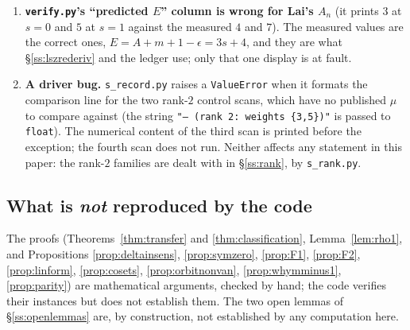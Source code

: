 \begin{enumerate}[label=\textup{(\alph*)},leftmargin=2.6em,itemsep=4pt]
\item \textbf{\texttt{verify.py}'s ``predicted $E$'' column is wrong for Lai's $A_n$}
      (it prints $3$ at $s=0$ and $5$ at $s=1$ against the measured $4$ and $7$). The
      measured values are the correct ones, $E=A+m+1-\epsilon=3s+4$, and they are what
      \S\ref{ss:lszrederiv} and the ledger use; only that one display is at fault.

\item \textbf{A driver bug.} \texttt{s\_record.py} raises a \texttt{ValueError} when it
      formats the comparison line for the two rank-$2$ control scans, which have no published
      $\mu$ to compare against (the string \texttt{"-- (rank 2: weights \{3,5\})"} is passed
      to \texttt{float}). The numerical content of the third scan is printed before the
      exception; the fourth scan does not run. Neither affects any statement in this paper:
      the rank-$2$ families are dealt with in \S\ref{ss:rank}, by \texttt{s\_rank.py}.
\end{enumerate}

\subsection{What is \emph{not} reproduced by the code}\label{ss:notreproduced}

The proofs (Theorems~\ref{thm:transfer} and \ref{thm:classification},
Lemma~\ref{lem:rho1}, and Propositions
\ref{prop:deltainsens}, \ref{prop:symzero}, \ref{prop:F1}, \ref{prop:F2},
\ref{prop:linform}, \ref{prop:cosets}, \ref{prop:orbitnonvan}, \ref{prop:whymminus1},
\ref{prop:parity}) are mathematical arguments, checked by hand; the code verifies their
instances but does not establish them. The two open lemmas of \S\ref{ss:openlemmas} are, by
construction, not established by any computation here.
